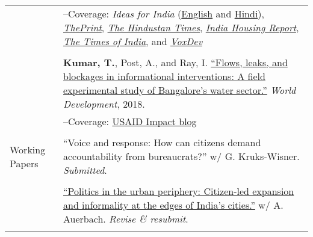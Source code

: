 \documentclass[letterpaper, 10.5pt]{article}
\begin{document}
\begin{longtable}{p{1.5in}p{5in}}
&--\indent Coverage: \textit{Ideas for India} (\href{https://www.ideasforindia.in/topics/poverty-inequality/household-level-effects-of-affordable-housing-evidence-from-mumbai.html}{English} and \href{https://www.ideasforindia.in/topics/poverty-inequality/household-level-effects-of-affordable-housing-evidence-from-mumbai-hindi.html}{Hindi}), \href{https://theprint.in/opinion/mumbai-residents-win-govt-housing-lottery-and-spend-more-on-kids-education-jobs-study/290485/}{\textit{ThePrint}}, \href{https://www.hindustantimes.com/opinion/housing-is-a-welfare-weapon-it-can-help-people-escape-poverty-101629993983576.html}{\textit{The Hindustan Times}}, \href{https://indiahousingreport.in/outputs/opinion/housing-is-a-welfare-weapon-it-can-help-people-escape-poverty/}{\textit{India Housing Report}}, \href{https://timesofindia.indiatimes.com/city/mumbai/mhada-home-winners-see-upswing-in-family-edu-pay-in-mumbai-study/articleshow/86468320.cms}{\textit{The Times of India}}, and \href{https://voxdev.org/topic/infrastructure-urbanisation/household-level-effects-subsidised-housing-evidence-urban-india?utm_source=dlvr.it&utm_medium=twitter}{\textit{VoxDev}} \\
& \\

&\textbf{Kumar, T.}, Post, A., and Ray, I. \href{https://www.sciencedirect.com/science/article/pii/S0305750X1830032}{``Flows, leaks, and blockages in informational interventions: A field experimental study of Bangalore's water sector.''} \textit{World Development}, 2018.\\

&--\indent Coverage: \href{https://blog.usaid.gov/2016/05/using-mobile-phones-to-alert-households-waiting-for-nextdrop-of-water/}{USAID Impact blog} \\
& \\


Working Papers

&``Voice and response:
How can citizens demand accountability from bureaucrats?'' w/ G. Kruks-Wisner. \textit{Submitted}.\\
& \\


& \href{https://gld.gu.se/media/2985/gld_workingpaper_63_auerbachkumar_202303.pdf}{``Politics in the urban periphery: Citizen-led expansion and informality at the edges of India's cities.''} w/ A. Auerbach.  \textit{Revise \& resubmit}.\\
& \\


\end{longtable}
\end{document}
